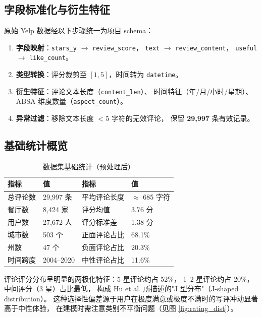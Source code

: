 \documentclass[12pt, a4paper]{article}
\begin{document}
\subsection{字段标准化与衍生特征}

原始 Yelp 数据经以下步骤统一为项目 schema：

\begin{enumerate}[leftmargin=2em]
  \item \textbf{字段映射}：\texttt{stars\_y} $\to$ \texttt{review\_score}，
        \texttt{text} $\to$ \texttt{review\_content}，
        \texttt{useful} $\to$ \texttt{like\_count}。
  \item \textbf{类型转换}：评分裁剪至 $[1,5]$，时间转为 \texttt{datetime}。
  \item \textbf{衍生特征}：评论文本长度（\texttt{content\_len}）、
        时间特征（年/月/小时/星期）、ABSA 维度数量（\texttt{aspect\_count}）。
  \item \textbf{异常过滤}：移除文本长度 $< 5$ 字符的无效评论，
        保留 \textbf{29,997} 条有效记录。
\end{enumerate}

\subsection{基础统计概览}

\begin{table}[H]
\centering
\caption{数据集基础统计（预处理后）}
\label{tab:basic_stats}
\begin{tabular}{llll}
\toprule
\textbf{指标} & \textbf{值} & \textbf{指标} & \textbf{值} \\
\midrule
总评论数   & 29,997 条  & 平均评论长度 & $\approx$ 685 字符 \\
餐厅数     & 8,424 家   & 评分均值     & 3.76 分 \\
用户数     & 27,672 人  & 评分标准差   & 1.38 分 \\
城市数     & 503 个     & 正面评论占比  & 68.1\% \\
州数       & 47 个      & 负面评论占比  & 20.3\% \\
时间跨度   & 2004--2020 & 中性评论占比  & 11.6\% \\
\bottomrule
\end{tabular}
\end{table}

评论评分分布呈明显的两极化特征：5 星评论约占 52\%，
1--2 星评论约占 20\%，中间评分（3 星）占比最低，
构成 Hu et al. \cite{hu2009overcoming} 所描述的"J 型分布"（J-shaped distribution）。
这种选择性偏差源于用户在极度满意或极度不满时的写评冲动显著高于中性体验，
在建模时需注意类别不平衡问题（见图 \ref{fig:rating_dist}）。
\end{document}
